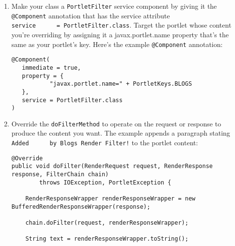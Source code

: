 \begin{enumerate}
\begin{verbatim}
        chain.doFilter(request, renderResponseWrapper);

        String text = renderResponseWrapper.toString();

        if (text != null) {
            String interestingText = "<input  class=\"field form-control\"";

            int index = text.lastIndexOf(interestingText);

            if (index >= 0) {
                String newText1 = text.substring(0, index);
                String newText2 = "\n<p>Added by Blogs Render Filter!</p>\n";
                String newText3 = text.substring(index);

                String newText = newText1 + newText2 + newText3;

                response.getWriter().write(newText);
            }
        }
    }

}
\end{verbatim}
\item
  Make your class a \texttt{PortletFilter} service component by giving
  it the \texttt{@Component} annotation that has the service attribute
  \texttt{service\ \ \ \ \ \ =\ PortletFilter.class}. Target the portlet
  whose content you're overriding by assigning it a javax.portlet.name
  property that's the same as your portlet's key. Here's the example
  \texttt{@Component} annotation:

\begin{verbatim}
@Component(
   immediate = true,
   property = {
           "javax.portlet.name=" + PortletKeys.BLOGS
   },
   service = PortletFilter.class
)
\end{verbatim}
\item
  Override the \texttt{doFilterMethod} to operate on the request or
  response to produce the content you want. The example appends a
  paragraph stating \texttt{Added\ \ \ \ \ \ by\ Blogs\ Render\ Filter!}
  to the portlet content:

\begin{verbatim}
@Override
public void doFilter(RenderRequest request, RenderResponse response, FilterChain chain)
        throws IOException, PortletException {

    RenderResponseWrapper renderResponseWrapper = new BufferedRenderResponseWrapper(response);

    chain.doFilter(request, renderResponseWrapper);

    String text = renderResponseWrapper.toString();


\end{verbatim}
\end{enumerate}
